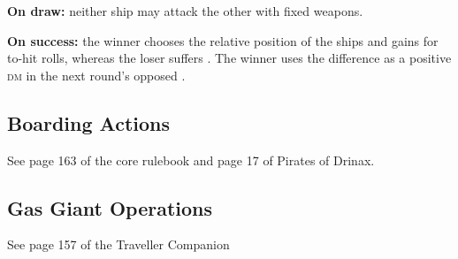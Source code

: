 \documentclass{cheatsheet}
\begin{document}
\begin{multicols}{3}
\textbf{On draw:} neither ship may attack the other with fixed weapons.

\textbf{On success:} the winner chooses the relative position of the
ships and gains  for to-hit rolls, whereas the loser
suffers .  The winner uses the difference as a positive
\textsc{dm} in the next round's opposed .

\subsection{Boarding Actions}

See page 163 of the core rulebook and page 17 of Pirates of Drinax.

\subsection{Gas Giant Operations}

See page 157 of the Traveller Companion
\end{multicols}
\end{document}
